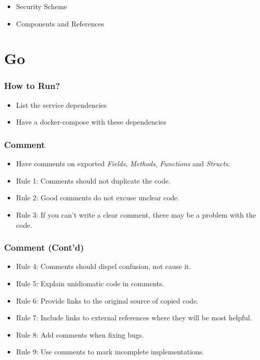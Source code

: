 \documentclass{efd-lecture}
\begin{document}
\begin{frame}
  \begin{itemize}
    \item Security Scheme
    \item Components and References
  \end{itemize}
\end{frame}

\section{Go}

\begin{frame}
  \frametitle{How to Run?}
  \begin{itemize}
    \item List the service dependencies
    \item Have a docker-compose with these dependencies
  \end{itemize}
\end{frame}

\begin{frame}
  \frametitle{Comment}
  \begin{itemize}
    \item Have comments on exported \textit{\color{YellowOrange}Fields}, \textit{\color{LimeGreen}Methods},
      \textit{\color{Cyan}Functions} and \textit{\color{RubineRed}Structs}.
    \item Rule 1: Comments should not duplicate the code.
    \item Rule 2: Good comments do not excuse unclear code.
    \item Rule 3: If you can’t write a clear comment, there may be a problem with the code.
  \end{itemize}
\end{frame}

\begin{frame}
  \frametitle{Comment (Cont'd)}
  \begin{itemize}
    \item Rule 4: Comments should dispel confusion, not cause it.
    \item Rule 5: Explain unidiomatic code in comments.
    \item Rule 6: Provide links to the original source of copied code.
    \item Rule 7: Include links to external references where they will be most helpful.
    \item Rule 8: Add comments when fixing bugs.
    \item Rule 9: Use comments to mark incomplete implementations.
  \end{itemize}
\end{frame}
\end{document}
